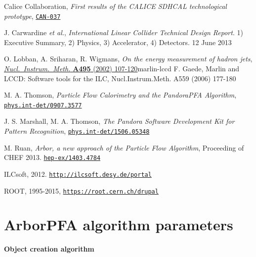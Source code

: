 \documentclass[cits]{JINST}
\begin{document}
\newpage
\begin{thebibliography}{6}
\renewcommand{\hepex}[1]{\href{http://www.arxiv.org/abs/#1}{\tt hep-ex/#1}}
\renewcommand{\physics}[1]{\href{http://www.arxiv.org/abs/#1}{\tt phys.int-det/#1}}
\newcommand\nim[4]{\href{http://dx.doi.org/10.1016/#4}
  {\emph{Nucl.\ Instrum.\ Meth.} {\bf #1} (#2) #3}}
\newcommand\can[1]{\href{https://twiki.cern.ch/twiki/pub/CALICE/CaliceAnalysisNotes/CAN-#1.pdf}{\tt CAN-#1}}


Calice Collaboration, \emph{First results of the CALICE SDHCAL technological prototype}, \can{037}

J. Carwardine {\it et al.},  \emph{International Linear Collider Technical Design Report}. 1) Executive Summary, 2) Physics, 3) Accelerator, 4) Detectors. 12 June 2013

O. Lobban, A. Sriharan, R. Wigmans,  \emph{On the energy measurement of hadron jets}, \nim{A495}{2002}{107-120}

\bibitem{marlin-lccd}
F. Gaede, Marlin and LCCD: Software tools for the ILC, Nucl.Instrum.Meth. A559 (2006) 177-180

M. A. Thomson, \emph{Particle Flow Calorimetry and the PandoraPFA Algorithm}, \physics{0907.3577}

J. S. Marshall, M. A. Thomson, \emph{The Pandora Software Development Kit for Pattern Recognition}, \physics{1506.05348}

M. Ruan, \emph{Arbor, a new approach of the Particle Flow Algorithm}, Proceeding of CHEF 2013. \hepex{1403.4784}

ILCsoft, 2012. \href{http://ilcsoft.desy.de/portal}{\tt http://ilcsoft.desy.de/portal}

ROOT, 1995-2015, \href{https://root.cern.ch/drupal}{\tt https://root.cern.ch/drupal}

\newpage

\end{thebibliography}


\clearpage
\appendix

\section{ArborPFA algorithm parameters}
\label{ARBOR_ALGORITHM_PARAMETERS}

\paragraph{Object creation algorithm} ~
\end{document}
